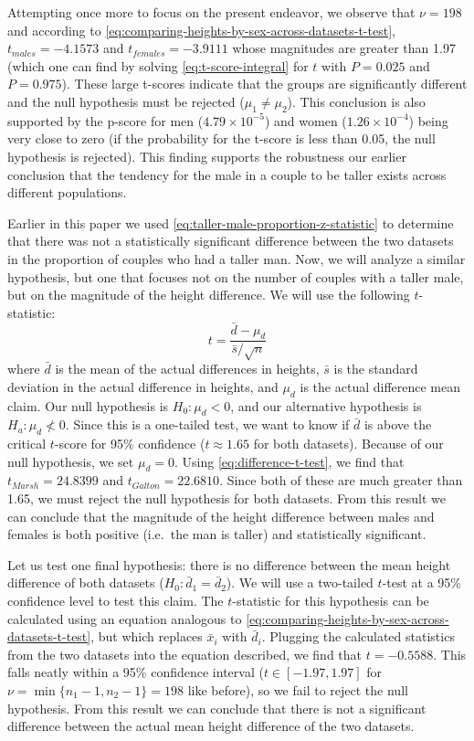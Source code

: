 Attempting once more to focus on the present endeavor, we observe that $\nu=198$ and according to \eqref{eq:comparing-heights-by-sex-across-datasets-t-test}, $t_{males}=-4.1573$ and $t_{females}=-3.9111$ whose magnitudes are greater than 1.97 (which one can find by solving \eqref{eq:t-score-integral} for $t$ with $P=0.025$ and $P=0.975$).
These large t-scores indicate that the groups are significantly different and the null hypothesis must be rejected ($\mu_1\neq \mu_2$).
This conclusion is also supported by the p-score for men ($4.79\times10^{-5}$) and women ($1.26\times10^{-4}$) being very close to zero (if the probability for the t-score is less than 0.05, the null hypothesis is rejected).
This finding supports the robustness our earlier conclusion that the tendency for the male in a couple to be taller exists across different populations.

Earlier in this paper we used \eqref{eq:taller-male-proportion-z-statistic} to determine that there was not a statistically significant difference between the two datasets in the proportion of couples who had a taller man.
Now, we will analyze a similar hypothesis, but one that focuses not on the number of couples with a taller male, but on the magnitude of the height difference.
We will use the following $t$-statistic:
\begin{equation}
   t=\frac{\bar{d}-\mu_d}{\bar{s}/\sqrt{n}}
   \label{eq:difference-t-test}
\end{equation}
where $\bar{d}$ is the mean of the actual differences in heights, $\bar{s}$ is the standard deviation in the actual difference in heights, and $\mu_d$ is the actual difference mean claim.
Our null hypothesis is $H_0: \mu_{d} < 0$, and our alternative hypothesis is $H_a:\mu_{d} \nless 0$.
Since this is a one-tailed test, we want to know if $\bar{d}$ is above the critical $t$-score for 95\% confidence ($t\approx1.65$ for both datasets).
Because of our null hypothesis, we set $\mu_d = 0$.
Using \eqref{eq:difference-t-test}, we find that $t_{Marsh}=24.8399$ and $t_{Galton}=22.6810$.
Since both of these are much greater than 1.65, we must reject the null hypothesis for both datasets.
From this result we can conclude that the magnitude of the height difference between males and females is both positive (i.e.\ the man is taller) and statistically significant.

Let us test one final hypothesis: there is no difference between the mean height difference of both datasets ($H_0:\bar{d}_1 = \bar{d}_2$).
We will use a two-tailed $t$-test at a 95\% confidence level to test this claim.
The $t$-statistic for this hypothesis can be calculated using an equation analogous to \eqref{eq:comparing-heights-by-sex-across-datasets-t-test}, but which replaces $\bar{x}_i$ with $\bar{d}_i$.
Plugging the calculated statistics from the two datasets into the equation described, we find that $t=-0.5588$.
This falls neatly within a 95\% confidence interval ($t\in[-1.97,1.97]$ for $\nu=\min\{n_1-1, n_2-1\}=198$ like before), so we fail to reject the null hypothesis.
From this result we can conclude that there is not a significant difference between the actual mean height difference of the two datasets.